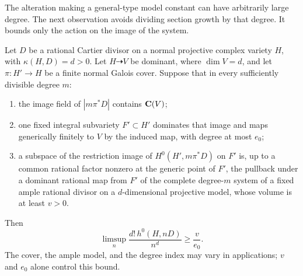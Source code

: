 The alteration making a general-type model constant can have arbitrarily
large degree.  The next observation avoids dividing section growth by
that degree.  It bounds only the action on the image of the system.

\begin{lemma}\label{num:invariants}
Let $D$ be a rational Cartier divisor on a normal projective complex
variety $H$, with $\kappa(H,D)=d>0$.  Let $H\dashrightarrow V$ be dominant,
where $\dim V=d$, and let $\pi:H'\to H$ be a finite normal Galois
cover.  Suppose that in every sufficiently divisible degree $m$:
\begin{enumerate}
\item the image field of $|m\pi^*D|$ contains $\mathbf C(V)$;
\item one fixed integral subvariety $F'\subset H'$ dominates that
image and maps generically finitely to $V$ by the induced map, with
degree at most $e_0$;
\item a subspace of the restriction image of
$H^0(H',m\pi^*D)$ on $F'$ is, up to a common rational factor
nonzero at the generic point of $F'$, the pullback under a dominant
rational map from $F'$ of the complete degree-$m$ system of a fixed
ample rational divisor on a $d$-dimensional projective model, whose
volume is at least $v>0$.
\end{enumerate}
Then
\begin{equation}\label{num:invariant-growth}
 \limsup_n\frac{d!\,h^0(H,nD)}{n^d}\geq\frac{v}{e_0}.
\end{equation}
The cover, the ample model, and the degree index may vary in
applications; $v$ and $e_0$ alone control this bound.
\end{lemma}


